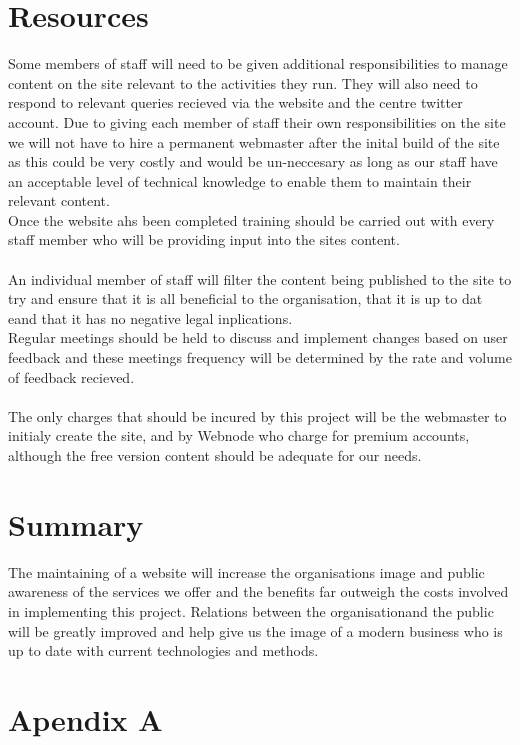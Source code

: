 \documentclass{article}
\begin{document}
\section{Resources}
Some members of staff will need to be given additional responsibilities to manage content on the site relevant to the activities they run.  They will also need to respond to relevant queries recieved via the website and the centre twitter account.  Due to giving each member of staff their own responsibilities on the site we will not have to hire a permanent webmaster after the inital build of the site as this could be very costly and would be un-neccesary as long as our staff have an acceptable level of technical knowledge to enable them to maintain their relevant content.
\\Once the website ahs been completed training should be carried out with every staff member who will be providing input into the sites content.
\\\\An individual member of staff will filter the content being published to the site to try and ensure that it is all beneficial to the organisation, that it is up to dat eand that it has no negative legal inplications.
\\Regular meetings should be held to discuss and implement changes based on user feedback and these meetings frequency will be determined by the rate and volume of feedback recieved.
\\\\The only charges that should be incured by this project will be the webmaster to initialy create the site, and by Webnode who charge for premium accounts, although the free version content should be adequate for our needs.

\section{Summary}
The maintaining of a website will increase the organisations image and public awareness of the services we offer and the benefits far outweigh the costs involved in implementing this project.  Relations between the organisationand the public will be greatly improved and help give us the image of a modern business who is up to date with current technologies and methods.
\newpage
\section{Apendix A}
\end{document}
